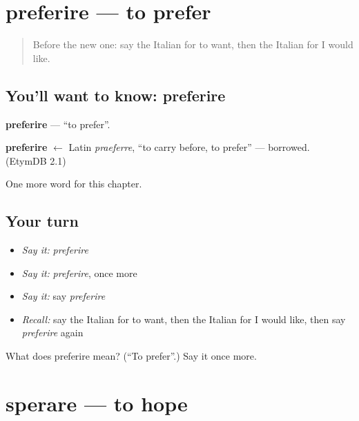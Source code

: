 \section[preferire]{preferire — to prefer}

\label{lesson:IT-C86-preferire}



\begin{quote}
Before the new one: say the Italian for to want, then the Italian for I would like.
\end{quote}

\subsection*{You'll want to know: preferire}
\textbf{preferire} — \textquotedblleft{}to prefer\textquotedblright{}.

\begin{cousinweb}
\textbf{preferire} $\leftarrow$ Latin \emph{praeferre}, \textquotedblleft{}to carry before, to prefer\textquotedblright{} — borrowed. (EtymDB 2.1)
\end{cousinweb}

\begin{grammarlens}[title={What you've built}]
One more word for this chapter.
\end{grammarlens}

\subsection*{Your turn}
\begin{itemize}
\raggedright
  \item \emph{Say it:} \emph{preferire}
  \item \emph{Say it:} \emph{preferire}, once more
  \item \emph{Say it:} say \emph{preferire}
  \item \emph{Recall:} say the Italian for to want, then the Italian for I would like, then say \emph{preferire} again
\end{itemize}

\begin{tcolorbox}[breakable,colback=teal!4,colframe=teal!35!black,title={Before you move on}]
What does preferire mean? (\textquotedblleft{}To prefer\textquotedblright{}.) Say it once more.
\end{tcolorbox}
\section[sperare]{sperare — to hope}

